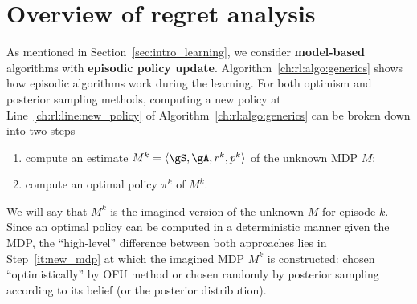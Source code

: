 \section{Overview of regret analysis}

As mentioned in Section~\ref{sec:intro_learning}, we consider \textbf{model-based} algorithms with \textbf{episodic policy update}.
Algorithm~\ref{ch:rl:algo:generics} shows how episodic algorithms work during the learning.
For both optimism and posterior sampling methods, computing a new policy at Line~\ref{ch:rl:line:new_policy} of Algorithm~\ref{ch:rl:algo:generics} can be broken down into two steps
\begin{enumerate}[label=(\roman*)]
    \item \label{it:new_mdp} compute an estimate $M^k=\langle\gS,\gA,r^k,p^k\rangle$ of the unknown MDP $M$;
    \item compute an optimal policy $\pi^k$ of $M^k$.
\end{enumerate}
We will say that $M^k$ is the imagined version of the unknown $M$ for episode $k$.
Since an optimal policy can be computed in a deterministic manner given the MDP, the ``high-level'' difference between both approaches lies in Step~\ref{it:new_mdp} at which the imagined MDP $M^k$ is constructed: chosen ``optimistically'' by OFU method or chosen randomly by posterior sampling according to its belief (or the posterior distribution).


